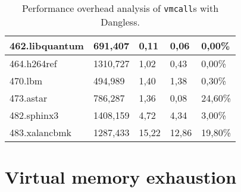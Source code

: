 \begin{table}[]
\begin{tabular}{|l|l|l|l|l|}
		462.libquantum     & 691,407                                                                          & 0,11                                                                & 0,06                                                                            & 0,00\%                                                                         \\ \hline
		464.h264ref        & 1310,727                                                                         & 1,02                                                                & 0,43                                                                            & 0,00\%                                                                         \\ \hline
		470.lbm            & 494,989                                                                          & 1,40                                                                & 1,38                                                                            & 0,30\%                                                                         \\ \hline
		473.astar          & 786,287                                                                          & 1,36                                                                & 0,08                                                                            & 24,60\%                                                                        \\ \hline
		482.sphinx3        & 1408,159                                                                         & 4,72                                                                & 4,34                                                                            & 3,00\%                                                                         \\ \hline
		483.xalancbmk      & 1287,433                                                                         & 15,22                                                               & 12,86                                                                           & 19,80\%                                                                        \\ \hline
	\end{tabular}
	\caption{Performance overhead analysis of \texttt{vmcall}s with Dangless.}
	\label{tab:dangless-vmcall-analysis}
\end{table}

\section{Virtual memory exhaustion}
\label{sec:virtmem-exhaustion}

